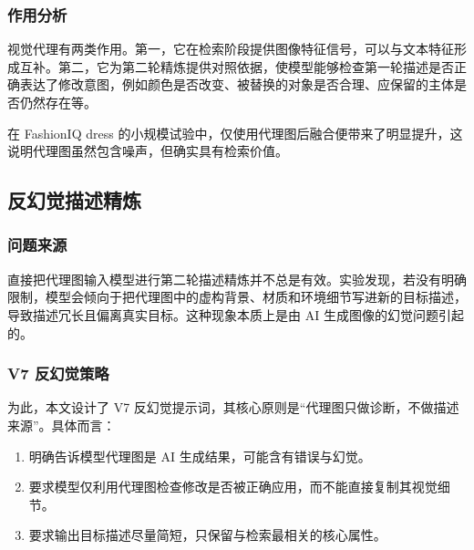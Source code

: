 \documentclass[12pt,a4paper,UTF8,oneside,openany]{ctexrep}
\providecommand{\tightlist}{%
  \setlength{\itemsep}{0pt}\setlength{\parskip}{0pt}}
\begin{document}
\hypertarget{ux4f5cux7528ux5206ux6790}{%
\subsubsection{作用分析}\label{ux4f5cux7528ux5206ux6790}}

视觉代理有两类作用。第一，它在检索阶段提供图像特征信号，可以与文本特征形成互补。第二，它为第二轮精炼提供对照依据，使模型能够检查第一轮描述是否正确表达了修改意图，例如颜色是否改变、被替换的对象是否合理、应保留的主体是否仍然存在等。

在 FashionIQ dress
的小规模试验中，仅使用代理图后融合便带来了明显提升，这说明代理图虽然包含噪声，但确实具有检索价值。

\hypertarget{ux53cdux5e7bux89c9ux63cfux8ff0ux7cbeux70bc}{%
\subsection{反幻觉描述精炼}\label{ux53cdux5e7bux89c9ux63cfux8ff0ux7cbeux70bc}}

\hypertarget{ux95eeux9898ux6765ux6e90}{%
\subsubsection{问题来源}\label{ux95eeux9898ux6765ux6e90}}

直接把代理图输入模型进行第二轮描述精炼并不总是有效。实验发现，若没有明确限制，模型会倾向于把代理图中的虚构背景、材质和环境细节写进新的目标描述，导致描述冗长且偏离真实目标。这种现象本质上是由
AI 生成图像的幻觉问题引起的。

\hypertarget{v7-ux53cdux5e7bux89c9ux7b56ux7565}{%
\subsubsection{V7 反幻觉策略}\label{v7-ux53cdux5e7bux89c9ux7b56ux7565}}

为此，本文设计了 V7
反幻觉提示词，其核心原则是``代理图只做诊断，不做描述来源''。具体而言：

\begin{enumerate}
\def\labelenumi{\arabic{enumi}.}
\tightlist
\item
  明确告诉模型代理图是 AI 生成结果，可能含有错误与幻觉。
\item
  要求模型仅利用代理图检查修改是否被正确应用，而不能直接复制其视觉细节。
\item
  要求输出目标描述尽量简短，只保留与检索最相关的核心属性。
\end{enumerate}
\end{document}
